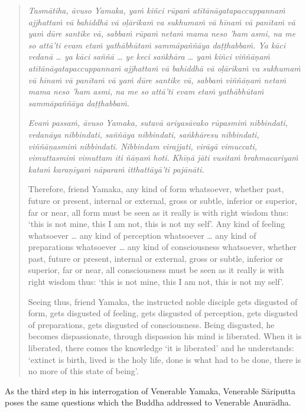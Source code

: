 \begin{quote}
\emph{Tasmātiha, āvuso Yamaka, yaṁ kiñci rūpaṁ atītānāgatapaccuppannaṁ ajjhattaṁ vā bahiddhā vā oḷārikaṁ va sukhumaṁ vā hīnaṁ vā panītaṁ vā yaṁ dūre santike vā, sabbaṁ rūpaṁ netaṁ mama neso 'ham asmi, na me so attā'ti evam etaṁ yathābhūtaṁ sammāpaññāya daṭṭhabbaṁ. Ya kāci vedanā \ldots{} ya kāci saññā \ldots{} ye keci saṅkhāra \ldots{} yaṁ kiñci viññāṇaṁ atītānāgatapaccuppannaṁ ajjhattaṁ vā bahiddhā vā oḷārikaṁ va sukhumaṁ vā hīnaṁ vā panītaṁ vā yaṁ dūre santike vā, sabbaṁ viññāṇaṁ netaṁ mama neso 'ham asmi, na me so attā'ti evam etaṁ yathābhūtaṁ sammāpaññāya daṭṭhabbaṁ.}

\emph{Evaṁ passaṁ, āvuso Yamaka, sutavā ariyasāvako rūpasmiṁ nibbindati, vedanāya nibbindati, saññāya nibbindati, saṅkhāresu nibbindati, viññāṇasmiṁ nibbindati. Nibbindam virajjati, virāgā vimuccati, vimuttasmiṁ vimuttam iti ñāṇaṁ hoti. Khīṇā jāti vusitaṁ brahmacariyaṁ kataṁ karaṇīyaṁ nāparaṁ itthattāyā'ti pajānāti.}

Therefore, friend Yamaka, any kind of form whatsoever, whether past, future or present, internal or external, gross or subtle, inferior or superior, far or near, all form must be seen as it really is with right wisdom thus: `this is not mine, this I am not, this is not my self'. Any kind of feeling whatsoever \ldots{} any kind of perception whatsoever \ldots{} any kind of preparations whatsoever \ldots{} any kind of consciousness whatsoever, whether past, future or present, internal or external, gross or subtle, inferior or superior, far or near, all consciousness must be seen as it really is with right wisdom thus: `this is not mine, this I am not, this is not my self'.

Seeing thus, friend Yamaka, the instructed noble disciple gets disgusted of form, gets disgusted of feeling, gets disgusted of perception, gets disgusted of preparations, gets disgusted of consciousness. Being disgusted, he becomes dispassionate, through dispassion his mind is liberated. When it is liberated, there comes the knowledge `it is liberated' and he understands: `extinct is birth, lived is the holy life, done is what had to be done, there is no more of this state of being'.
\end{quote}

As the third step in his interrogation of Venerable Yamaka, Venerable Sāriputta poses the same questions which the Buddha addressed to Venerable Anurādha.


